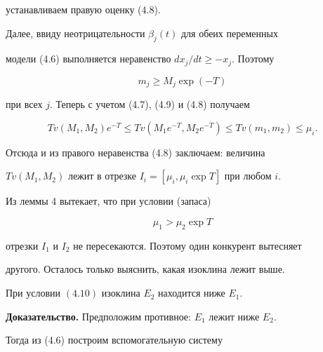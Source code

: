 устанавливаем правую оценку (4.8). 


 


Далее, ввиду неотрицательности $\beta_j(t)$ для обеих переменных 


модели (4.6) выполняется неравенство $d x_j/d t\ge-x_j$. Поэтому 


\begin{equation} 


m_j\ge M_j\exp(-T) 


\end{equation} 


при всех $j$. Теперь с учетом (4.7), (4.9) и (4.8) получаем 


$$ 


T v(M_1,M_2)e^{-T}\le T v(M_1e^{-T},M_2e^{-T}) 


\le T v(m_1,m_2)\le\mu_i. 


$$ 


 


Отсюда и из правого неравенства (4.8) заключаем: величина 


$T v(M_1,M_2)$ лежит в отрезке $I_i=[\mu_i,\mu_i\exp T]$ при любом $i$. 


 


Из леммы 4 вытекает, что при условии (запаса) 


\begin{equation} 


\mu_1>\mu_2\exp T 


\end{equation} 


отрезки $I_1$ и $I_2$ не пересекаются. Поэтому один конкурент вытесняет 


другого. Осталось только выяснить, какая изоклина лежит выше. 


 


\begin{lem} 


При условии $(4.10)$ изоклина $E_2$ находится ниже $E_1$. 


\end{lem} 


 


{\bf Доказательство.} Предположим противное: $E_1$ лежит ниже $E_2$. 


Тогда из (4.6) построим вспомогательную систему 


